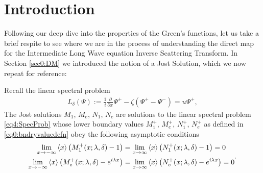 \documentclass[../dissertation.tex]{subfiles}
\begin{document}
\section{Introduction}\label{sec4.0:Intro}

Following our deep dive into the properties of the Green's functions, let us take
a brief respite to see where we are in the process of understanding the direct
map for the Intermediate Long Wave equation Inverse Scattering Transform. In Section
\ref{sec0:DM} we introduced the notion of a Jost Solution, which we now repeat for
reference: 
\begin{defn}\label{defn4:jost}
	Recall the linear spectral problem 
	\begin{align}\label{eq4:SpecProb}
		L_\delta (\Psi) 
			:= \frac{1}{i} \frac{\partial}{\partial x} \Psi^+ 
				- \zeta \left(\Psi^+ - \Psi^-\right) = u \Psi^+,
	\end{align}
	The Jost solutions $M_1$, $M_e$, $N_1$, $N_e$ are solutions to the linear 
	spectral problem \eqref{eq4:SpecProb} whose lower boundary values
	$M_1^+$, $M_e^+$, $N_1^+$, $N_e^+$ as defined in \eqref{eq0:bndryvaluedefn}
	obey the following asymptotic conditions
	\begin{subequations}\label{eq4:JostDEasymp}
		\begin{align}
			\lim_{x\to -\infty} 
					\inn{x} 
					\left( 
						M_1^+(x; \lambda, \delta) - 1 
					\right)
				&= \lim_{x\to \infty} 
						\inn{x} 
						\left( 
							N_1^+(x; \lambda, \delta) - 1
						\right)
				= 0 \\
			\lim_{x\to -\infty} 
					\inn{x} \left( 
						M_e^+(x; \lambda, \delta) - e^{i\lambda x}
					\right)
				&= \lim_{x\to \infty} 
						\inn{x} 
						\left( 
							N_e^+(x; \lambda, \delta) - e^{i\lambda x}
						\right)
				= 0
		\end{align}.
	\end{subequations}


\end{defn}
\end{document}
